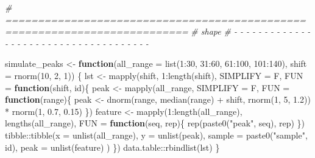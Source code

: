 \documentclass[
]{article}
\newenvironment{Shaded}{\begin{snugshade}}{\end{snugshade}}
\newcommand{\AttributeTok}[1]{\textcolor[rgb]{0.77,0.63,0.00}{#1}}
\newcommand{\CommentTok}[1]{\textcolor[rgb]{0.56,0.35,0.01}{\textit{#1}}}
\newcommand{\ControlFlowTok}[1]{\textcolor[rgb]{0.13,0.29,0.53}{\textbf{#1}}}
\newcommand{\DecValTok}[1]{\textcolor[rgb]{0.00,0.00,0.81}{#1}}
\newcommand{\FloatTok}[1]{\textcolor[rgb]{0.00,0.00,0.81}{#1}}
\newcommand{\FunctionTok}[1]{\textcolor[rgb]{0.00,0.00,0.00}{#1}}
\newcommand{\NormalTok}[1]{#1}
\newcommand{\OtherTok}[1]{\textcolor[rgb]{0.56,0.35,0.01}{#1}}
\newcommand{\SpecialCharTok}[1]{\textcolor[rgb]{0.00,0.00,0.00}{#1}}
\newcommand{\StringTok}[1]{\textcolor[rgb]{0.31,0.60,0.02}{#1}}
\begin{document}
\begin{Shaded}
\begin{Highlighting}[]
\CommentTok{\# ==========================================================================}
\CommentTok{\# shape}
\CommentTok{\# {-} {-} {-} {-} {-} {-} {-} {-} {-} {-} {-} {-} {-} {-} {-} {-} {-} {-} {-} {-} {-} {-} {-} {-} {-} {-} {-} {-} {-} {-} {-} {-} {-} {-} {-} {-} {-}}

\NormalTok{simulate\_peaks }\OtherTok{\textless{}{-}} \ControlFlowTok{function}\NormalTok{(}\AttributeTok{all\_range =} \FunctionTok{list}\NormalTok{(}\DecValTok{1}\SpecialCharTok{:}\DecValTok{30}\NormalTok{, }\DecValTok{31}\SpecialCharTok{:}\DecValTok{60}\NormalTok{, }\DecValTok{61}\SpecialCharTok{:}\DecValTok{100}\NormalTok{, }\DecValTok{101}\SpecialCharTok{:}\DecValTok{140}\NormalTok{),}
  \AttributeTok{shift =} \FunctionTok{rnorm}\NormalTok{(}\DecValTok{10}\NormalTok{, }\DecValTok{2}\NormalTok{, }\DecValTok{1}\NormalTok{))}
\NormalTok{\{}
\NormalTok{  lst }\OtherTok{\textless{}{-}} \FunctionTok{mapply}\NormalTok{(shift, }\DecValTok{1}\SpecialCharTok{:}\FunctionTok{length}\NormalTok{(shift), }\AttributeTok{SIMPLIFY =}\NormalTok{ F, }\AttributeTok{FUN =} \ControlFlowTok{function}\NormalTok{(shift, id)\{}
\NormalTok{    peak }\OtherTok{\textless{}{-}} \FunctionTok{mapply}\NormalTok{(all\_range, }\AttributeTok{SIMPLIFY =}\NormalTok{ F,}
      \AttributeTok{FUN =} \ControlFlowTok{function}\NormalTok{(range)\{}
\NormalTok{        peak }\OtherTok{\textless{}{-}} \FunctionTok{dnorm}\NormalTok{(range, }\FunctionTok{median}\NormalTok{(range) }\SpecialCharTok{+}\NormalTok{ shift, }\FunctionTok{rnorm}\NormalTok{(}\DecValTok{1}\NormalTok{, }\DecValTok{5}\NormalTok{, }\FloatTok{1.2}\NormalTok{)) }\SpecialCharTok{*}
          \FunctionTok{rnorm}\NormalTok{(}\DecValTok{1}\NormalTok{, }\FloatTok{0.7}\NormalTok{, }\FloatTok{0.15}\NormalTok{)}
\NormalTok{      \})}
\NormalTok{    feature }\OtherTok{\textless{}{-}} \FunctionTok{mapply}\NormalTok{(}\DecValTok{1}\SpecialCharTok{:}\FunctionTok{length}\NormalTok{(all\_range), }\FunctionTok{lengths}\NormalTok{(all\_range),}
      \AttributeTok{FUN =} \ControlFlowTok{function}\NormalTok{(seq, rep)\{}
        \FunctionTok{rep}\NormalTok{(}\FunctionTok{paste0}\NormalTok{(}\StringTok{"peak"}\NormalTok{, seq), rep)}
\NormalTok{      \})}
\NormalTok{    tibble}\SpecialCharTok{::}\FunctionTok{tibble}\NormalTok{(}\AttributeTok{x =} \FunctionTok{unlist}\NormalTok{(all\_range), }\AttributeTok{y =} \FunctionTok{unlist}\NormalTok{(peak),}
      \AttributeTok{sample =} \FunctionTok{paste0}\NormalTok{(}\StringTok{"sample"}\NormalTok{, id),}
      \AttributeTok{peak =} \FunctionTok{unlist}\NormalTok{(feature)}
\NormalTok{    )}
\NormalTok{  \})}
\NormalTok{  data.table}\SpecialCharTok{::}\FunctionTok{rbindlist}\NormalTok{(lst)}
\NormalTok{\}}
\end{Highlighting}
\end{Shaded}
\end{document}
